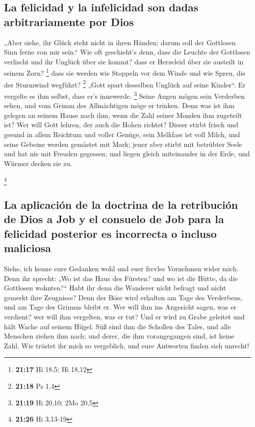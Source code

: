 \hypertarget{la-felicidad-y-la-infelicidad-son-dadas-arbitrariamente-por-dios}{%
\subsection{La felicidad y la infelicidad son dadas arbitrariamente por
Dios}\label{la-felicidad-y-la-infelicidad-son-dadas-arbitrariamente-por-dios}}

 „Aber siehe, ihr Glück steht nicht in ihren Händen;
darum soll der Gottlosen Sinn ferne von mir sein.``  Wie
oft geschieht's denn, dass die Leuchte der Gottlosen verlischt und ihr
Unglück über sie kommt? dass er Herzeleid über sie austeilt in seinem
Zorn? \footnote{\textbf{21:17} Hi 18,5; Hi 18,12}  dass
sie werden wie Stoppeln vor dem Winde und wie Spreu, die der Sturmwind
wegführt? \footnote{\textbf{21:18} Ps 1,4}  „Gott spart
desselben Unglück auf seine Kinder``. Er vergelte es ihm selbst, dass
er's innewerde. \footnote{\textbf{21:19} Hi 20,10; 2Mo 20,5}
 Seine Augen mögen sein Verderben sehen, und vom Grimm
des Allmächtigen möge er trinken.  Denn was ist ihm
gelegen an seinem Hause nach ihm, wenn die Zahl seiner Monden ihm
zugeteilt ist?  Wer will Gott lehren, der auch die Hohen
richtet?  Dieser stirbt frisch und gesund in allem
Reichtum und voller Genüge,  sein Melkfass ist voll
Milch, und seine Gebeine werden gemästet mit Mark;  jener
aber stirbt mit betrübter Seele und hat nie mit Freuden gegessen;
 und liegen gleich miteinander in der Erde, und Würmer
decken sie zu.

\footnote{\textbf{21:26} Hi 3,13-19}

\hypertarget{la-aplicaciuxf3n-de-la-doctrina-de-la-retribuciuxf3n-de-dios-a-job-y-el-consuelo-de-job-para-la-felicidad-posterior-es-incorrecta-o-incluso-maliciosa}{%
\subsection{La aplicación de la doctrina de la retribución de Dios a Job
y el consuelo de Job para la felicidad posterior es incorrecta o incluso
maliciosa}\label{la-aplicaciuxf3n-de-la-doctrina-de-la-retribuciuxf3n-de-dios-a-job-y-el-consuelo-de-job-para-la-felicidad-posterior-es-incorrecta-o-incluso-maliciosa}}

 Siehe, ich kenne eure Gedanken wohl und euer frevles
Vornehmen wider mich.  Denn ihr sprecht: „Wo ist das Haus
des Fürsten? und wo ist die Hütte, da die Gottlosen wohnten?{}``
 Habt ihr denn die Wanderer nicht befragt und nicht
gemerkt ihre Zeugnisse?  Denn der Böse wird erhalten am
Tage des Verderbens, und am Tage des Grimms bleibt er. 
Wer will ihm ins Angesicht sagen, was er verdient? wer will ihm
vergelten, was er tut?  Und er wird zu Grabe geleitet und
hält Wache auf seinem Hügel.  Süß sind ihm die Schollen
des Tales, und alle Menschen ziehen ihm nach; und derer, die ihm
vorangegangen sind, ist keine Zahl.  Wie tröstet ihr mich
so vergeblich, und eure Antworten finden sich unrecht!

